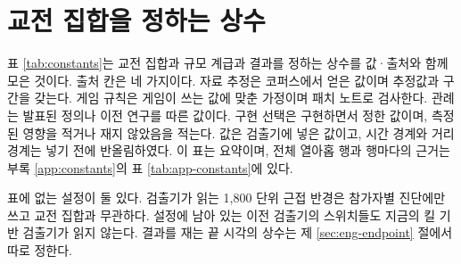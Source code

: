 \section{교전 집합을 정하는 상수}
\label{sec:eng-constants}

표 \ref{tab:constants}는 교전 집합과 규모 계급과 결과를 정하는 상수를 값·출처와 함께 모은 것이다. 출처 칸은 네 가지이다. 자료 추정은 코퍼스에서 얻은 값이며 추정값과 구간을 갖는다. 게임 규칙은 게임이 쓰는 값에 맞춘 가정이며 패치 노트로 검사한다. 관례는 발표된 정의나 이전 연구를 따른 값이다. 구현 선택은 구현하면서 정한 값이며, 측정된 영향을 적거나 재지 않았음을 적는다. 값은 검출기에 넣은 값이고, 시간 경계와 거리 경계는 넣기 전에 반올림하였다. 이 표는 요약이며, 전체 열아홉 행과 행마다의 근거는 부록 \ref{app:constants}의 표 \ref{tab:app-constants}에 있다.



표에 없는 설정이 둘 있다. 검출기가 읽는 1{,}800 단위 근접 반경은 참가자별 진단에만 쓰고 교전 집합과 무관하다. 설정에 남아 있는 이전 검출기의 스위치들도 지금의 킬 기반 검출기가 읽지 않는다. 결과를 재는 끝 시각의 상수는 제 \ref{sec:eng-endpoint} 절에서 따로 정한다.
